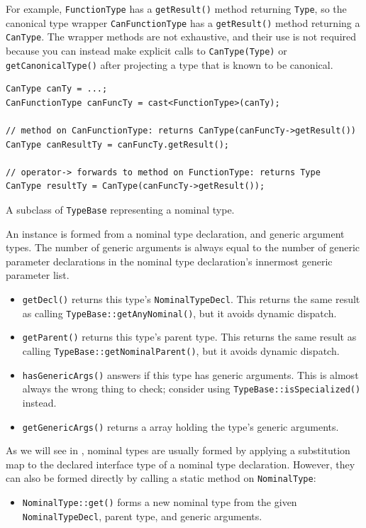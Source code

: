 \documentclass[../generics]{subfiles}
\begin{document}
For example, \texttt{FunctionType} has a \texttt{getResult()} method returning \texttt{Type}, so the canonical type wrapper \texttt{CanFunctionType} has a \texttt{getResult()} method returning a \texttt{CanType}. The wrapper methods are not exhaustive, and their use is not required because you can instead make explicit calls to \texttt{CanType(Type)} or \texttt{getCanonicalType()} after projecting a type that is known to be canonical.
\begin{Verbatim}
CanType canTy = ...;
CanFunctionType canFuncTy = cast<FunctionType>(canTy);

// method on CanFunctionType: returns CanType(canFuncTy->getResult())
CanType canResultTy = canFuncTy.getResult();

// operator-> forwards to method on FunctionType: returns Type
CanType resultTy = CanType(canFuncTy->getResult());
\end{Verbatim}

A subclass of \texttt{TypeBase} representing a nominal type.

An instance is formed from a nominal type declaration, and generic argument types. The number of generic arguments is always equal to the number of generic parameter declarations in the nominal type declaration's innermost generic parameter list.
\begin{itemize}
\item \texttt{getDecl()} returns this type's \texttt{NominalTypeDecl}. This returns the same result as calling \texttt{TypeBase::getAnyNominal()}, but it avoids dynamic dispatch.
\item \texttt{getParent()} returns this type's parent type. This returns the same result as calling \texttt{TypeBase::getNominalParent()}, but it avoids dynamic dispatch.
\item \texttt{hasGenericArgs()} answers if this type has generic arguments. This is almost always the wrong thing to check; consider using \texttt{TypeBase::isSpecialized()} instead.
\item \texttt{getGenericArgs()} returns a array holding the type's generic arguments.
\end{itemize}
As we will see in , nominal types are usually formed by applying a substitution map to the declared interface type of a nominal type declaration. However, they can also be formed directly by calling a static method on \texttt{NominalType}:
\begin{itemize}
\item \texttt{NominalType::get()} forms a new nominal type from the given \texttt{NominalTypeDecl}, parent type, and generic arguments.
\end{itemize}
\end{document}

